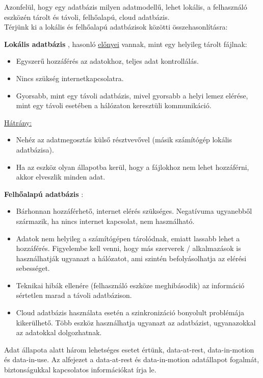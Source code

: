 \vspace{10pt}
\noindent Azonfelül, hogy egy adatbázis milyen adatmodellű, lehet lokális, a felhasználó eszközén tárolt és távoli, felhőalapú, cloud adatbázis.
\\ Térjünk ki a lokális és felhőalapú adatbázisok közötti összehasonlításra: \newline


\noindent \textbf{Lokális adatbázis} \cite{enwiki:1085248519}, hasonló \underline{előnyei} vannak, mint egy helyileg tárolt fájlnak:
\begin{itemize}
	\item Egyszerű hozzáférés az adatokhoz, teljes adat kontrollálás.
	\item Nincs szükség internetkapcsolatra.
	\item Gyorsabb, mint egy távoli adatbázis, mivel gyorsabb a helyi lemez elérése, mint egy távoli esetében a hálózaton keresztüli kommunikáció.
\end{itemize}
\noindent \underline{Hátrány:}
\begin{itemize}
	\item Nehéz az adatmegosztás külső résztvevővel (másik számítógép lokális adatbázisa).
	\item Ha az eszköz olyan állapotba kerül, hogy a fájlokhoz nem lehet hozzáférni, akkor elveszlik minden adat.
\end{itemize}

\newpage \noindent \textbf{Felhőalapú adatbázis} \cite{chandra2012study}:
\begin{itemize}
	\item Bárhonnan hozzáférhető, internet elérés szükséges. Negatívuma ugyanebből származik, ha nincs internet kapcsolat, nem használható.
	\item Adatok nem helyileg a számítógépen tárolódnak, emiatt lassabb lehet a hozzáférés. Figyelembe kell venni, hogy más szerverek / alkalmazások is használhatják ugyanazt a hálózatot, ami szintén befolyásolhatja az elérési sebességet.
	\item Teknikai hibák ellenére (felhasználó eszköze meghibásodik) az információ sértetlen marad a távoli adatbázison.
	\item Cloud adatbázis használata esetén a szinkronizáció bonyolult problémája kikerülhető. Több eszköz használhatja ugyanazt az adatbázist, ugyanazokkal az adatokkal dolgozhatnak.
\end{itemize}

\newpage
{}
Adat állapota alatt három lehetséges esetet értünk, data-at-rest, data-in-motion és data-in-use. Az alfejezet a data-at-rest és data-in-motion \cite{varriale2016secube} adatállapot fogalmát, biztonságukkal kapcsolatos információkat írja le.

